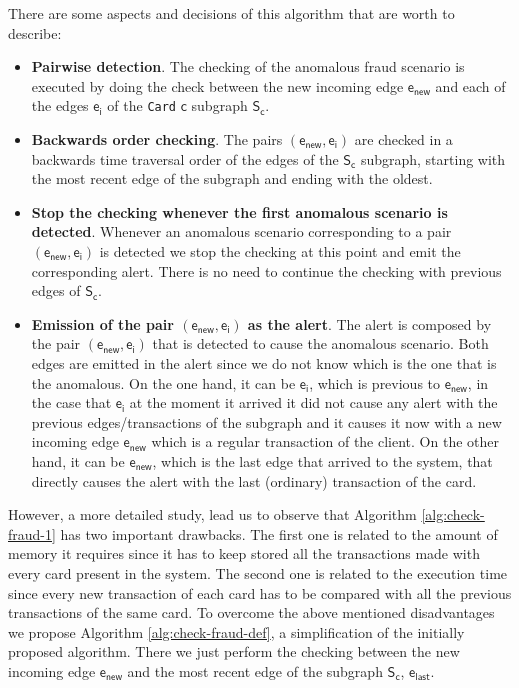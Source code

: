 There are some aspects and decisions of this algorithm that are worth to describe:

\begin{itemize}
    \item \textbf{Pairwise detection}. The checking of the anomalous fraud scenario is executed 
    by doing the check between the new incoming edge $\mathsf{e_{new}}$ and each of the edges $\mathsf{e_i}$ of the \texttt{Card} $\mathsf{c}$ subgraph $\mathsf{S_c}$.
    \item \textbf{Backwards order checking}. The pairs $(\mathsf{e_{new}, e_i})$ are checked in a backwards time traversal order of the edges of the $\mathsf{S_c}$ subgraph, starting with the most recent edge of the subgraph and ending with the oldest.  
    \item \textbf{Stop the checking whenever the first anomalous scenario is detected}. Whenever an anomalous scenario corresponding to a pair $(\mathsf{e_{new}, e_i})$ is detected 
    we stop the checking at this point and emit the corresponding alert. There is no need to continue the checking with previous edges of $\mathsf{S_c}$. 
    \item \textbf{Emission of the pair $(\mathsf{e_{new}, e_i})$ as the alert}. The alert is composed by the pair $(\mathsf{e_{new}, e_i})$ that is detected to cause the anomalous scenario. Both edges are emitted in the alert since we do not know which is the one that is the anomalous. On the one hand, it can be $\mathsf{e_i}$, which is previous to $\mathsf{e_{new}}$, in the case that $\mathsf{e_i}$ at the moment it arrived it did not cause any alert with the previous edges/transactions of the subgraph and it causes it now with a new incoming edge $\mathsf{e_{new}}$ which is a regular transaction of the client. On the other hand, it can be $\mathsf{e_{new}}$, which is the last edge that arrived to the system, that directly causes the alert with the last (ordinary) transaction of the card.
\end{itemize}

However, a more detailed study, lead us to observe that Algorithm \ref{alg:check-fraud-1} has two important drawbacks. 
The first one is related to the amount of memory it requires since it has to keep stored all the transactions made with every card present in the system. 
The second one is related to the execution time since every new transaction of each card has to be compared with all the previous transactions of the same card. 
To overcome the above mentioned disadvantages we propose Algorithm \ref{alg:check-fraud-def}, a simplification of the initially proposed algorithm. 
There we just perform the checking between the new incoming edge $\mathsf{e_{new}}$ and the most recent edge of the subgraph $\mathsf{S_c}$, $\mathsf{e_{last}}$.


